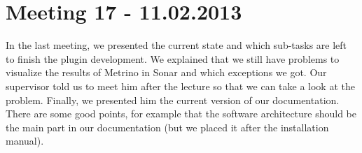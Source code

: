 \section{Meeting 17 - 11.02.2013}
In the last meeting, we presented the current state and which sub-tasks are left to finish the plugin development. We explained that we still have problems to visualize the results of Metrino in Sonar and which exceptions we got. Our supervisor told us to meet him after the lecture so that we can take a look at the problem. Finally, we presented him the current version of our documentation. There are some good points, for example that the software architecture should be the main part in our documentation (but we placed it after the installation manual). 